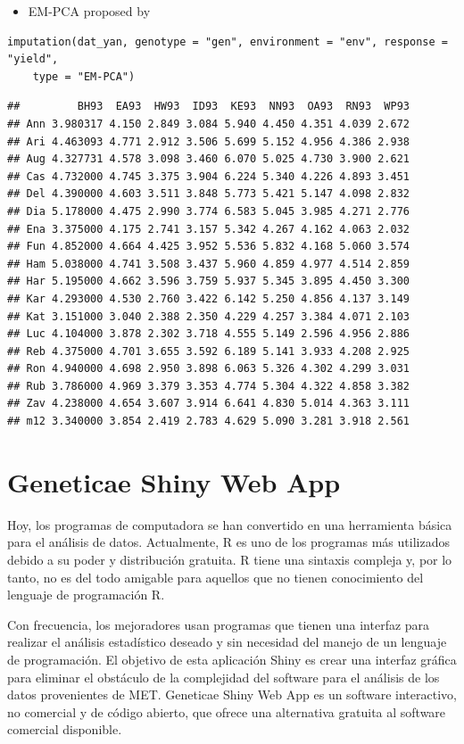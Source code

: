 \begin{itemize}
\item EM-PCA proposed by
\end{itemize}
\begin{lstlisting}
imputation(dat_yan, genotype = "gen", environment = "env", response = "yield", 
    type = "EM-PCA")
\end{lstlisting}

\begin{verbatim}
##         BH93  EA93  HW93  ID93  KE93  NN93  OA93  RN93  WP93
## Ann 3.980317 4.150 2.849 3.084 5.940 4.450 4.351 4.039 2.672
## Ari 4.463093 4.771 2.912 3.506 5.699 5.152 4.956 4.386 2.938
## Aug 4.327731 4.578 3.098 3.460 6.070 5.025 4.730 3.900 2.621
## Cas 4.732000 4.745 3.375 3.904 6.224 5.340 4.226 4.893 3.451
## Del 4.390000 4.603 3.511 3.848 5.773 5.421 5.147 4.098 2.832
## Dia 5.178000 4.475 2.990 3.774 6.583 5.045 3.985 4.271 2.776
## Ena 3.375000 4.175 2.741 3.157 5.342 4.267 4.162 4.063 2.032
## Fun 4.852000 4.664 4.425 3.952 5.536 5.832 4.168 5.060 3.574
## Ham 5.038000 4.741 3.508 3.437 5.960 4.859 4.977 4.514 2.859
## Har 5.195000 4.662 3.596 3.759 5.937 5.345 3.895 4.450 3.300
## Kar 4.293000 4.530 2.760 3.422 6.142 5.250 4.856 4.137 3.149
## Kat 3.151000 3.040 2.388 2.350 4.229 4.257 3.384 4.071 2.103
## Luc 4.104000 3.878 2.302 3.718 4.555 5.149 2.596 4.956 2.886
## Reb 4.375000 4.701 3.655 3.592 6.189 5.141 3.933 4.208 2.925
## Ron 4.940000 4.698 2.950 3.898 6.063 5.326 4.302 4.299 3.031
## Rub 3.786000 4.969 3.379 3.353 4.774 5.304 4.322 4.858 3.382
## Zav 4.238000 4.654 3.607 3.914 6.641 4.830 5.014 4.363 3.111
## m12 3.340000 3.854 2.419 2.783 4.629 5.090 3.281 3.918 2.561
\end{verbatim}


\section{Geneticae Shiny Web App}

Hoy, los programas de computadora se han convertido en una herramienta básica para el análisis de datos. Actualmente, R es uno de los programas más utilizados debido a su poder y distribución gratuita. R tiene una sintaxis compleja y, por lo tanto, no es del todo amigable para aquellos que no tienen conocimiento del lenguaje de programación R.

Con frecuencia, los mejoradores usan programas que tienen una interfaz para realizar el análisis estadístico deseado y sin necesidad del manejo de un lenguaje de programación. El objetivo de esta aplicación Shiny es crear una interfaz gráfica para eliminar el obstáculo de la complejidad del software para el análisis de los datos provenientes de MET. Geneticae Shiny Web App
es un software interactivo, no comercial y de código abierto, que ofrece una alternativa gratuita al software comercial disponible.

